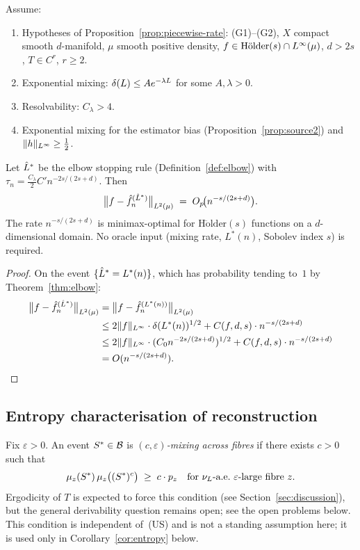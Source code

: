\begin{theorem}
\label{thm:algebra}
Assume:
\begin{enumerate}[label=(\roman*)]
  \item Hypotheses of Proposition~\ref{prop:piecewise-rate}:
    (G1)--(G2), $X$ compact smooth $d$-manifold, $\mu$ smooth positive density,
    $f \in \mathrm{H\ddot{o}lder}(s) \cap L^{\infty}(\mu)$, $d > 2s$, $T \in C^r$, $r \geq 2$.
  \item Exponential mixing: $\delta(L) \leq A e^{-\lambda L}$ for some $A, \lambda > 0$.
  \item Resolvability: $C_\lambda > 4$.
  \item Exponential mixing for the estimator bias (Proposition~\ref{prop:source2})
    and $\|h\|_{L^{\infty}} \geq \frac{1}{2}$.
\end{enumerate}
Let $\hat{L}^*$ be the elbow stopping rule (Definition~\ref{def:elbow}) with
$\tau_n = \frac{C_\lambda}{2} C' n^{-2s/(2s+d)}$.
Then
\[
  \bigl\|f - \hat{f}_n^{(\hat{L}^*)}\bigr\|_{L^{2}(\mu)}
  \;=\; O_p\!\bigl(n^{-s/(2s+d)}\bigr).
\]
The rate $n^{-s/(2s+d)}$ is minimax-optimal for $\mathrm{H\ddot{o}lder}(s)$
functions on a $d$-dimensional domain.
No oracle input (mixing rate, $L^*(n)$, Sobolev index $s$) is required.
\end{theorem}

\begin{proof}
On the event $\{\hat{L}^* = L^*(n)\}$, which has probability tending to~$1$ by
Theorem~\ref{thm:elbow}:
\begin{align*}
  \bigl\|f - \hat{f}_n^{(\hat{L}^*)}\bigr\|_{L^{2}(\mu)}
  &= \bigl\|f - \hat{f}_n^{(L^*(n))}\bigr\|_{L^{2}(\mu)} \\
  &\leq 2\|f\|_{L^{\infty}} \cdot \delta(L^*(n))^{1/2}
    + C(f,d,s) \cdot n^{-s/(2s+d)} \\
  &\leq 2\|f\|_{L^{\infty}} \cdot (C_0 n^{-2s/(2s+d)})^{1/2}
    + C(f,d,s) \cdot n^{-s/(2s+d)} \\
  &= O(n^{-s/(2s+d)}). \qedhere
\end{align*}
\end{proof}

\subsection{Entropy characterisation of reconstruction}
\label{subsec:entropy}

\begin{definition}
\label{def:fibre-mixing}
Fix $\varepsilon > 0$.
An event $S^* \in \mathcal{B}$ is \emph{$(c,\varepsilon)$-mixing across fibres} if
there exists $c > 0$ such that
\[
  \mu_z(S^*)\,\mu_z\bigl((S^*)^c\bigr) \;\geq\; c\cdot p_z
  \quad\text{for $\nu_L$-a.e.\ $\varepsilon$-large fibre } z.
\]
Ergodicity of $T$ is expected to force this condition (see
Section~\ref{sec:discussion}), but the general derivability question remains
open; see the open problems below.
This condition is independent of~(US) and is not a standing assumption here;
it is used only in Corollary~\ref{cor:entropy} below.
\end{definition}

